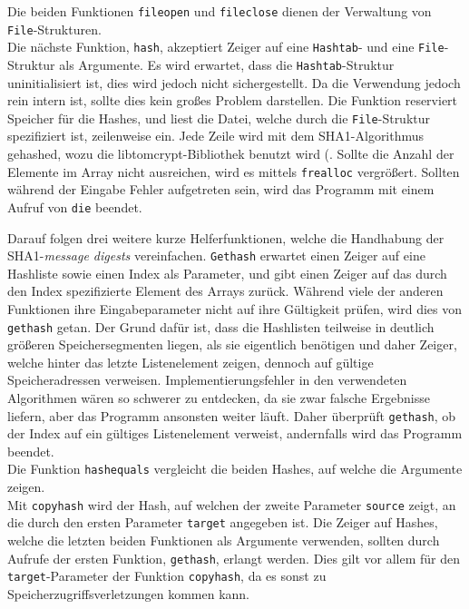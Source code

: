 \documentclass[a4paper,titlepage,12pt]{scrartcl}
\begin{document}
Die beiden Funktionen \texttt{fileopen} und \texttt{fileclose} dienen der Verwaltung von \texttt{File}-Strukturen.
\\
Die nächste Funktion, \texttt{hash}, akzeptiert Zeiger auf eine \texttt{Hashtab}- und eine \texttt{File}-Struktur als Argumente.
Es wird erwartet,
dass die \texttt{Hashtab}-Struktur uninitialisiert ist,
dies wird jedoch nicht sichergestellt.
Da die Verwendung jedoch rein intern ist,
sollte dies kein großes Problem darstellen.
Die Funktion reserviert Speicher für die Hashes,
und liest die Datei,
welche durch die \texttt{File}-Struktur spezifiziert ist,
zeilenweise ein.
Jede Zeile wird mit dem SHA1-Algorithmus gehashed,
wozu die libtomcrypt-Bibliothek benutzt wird (\citet{lib:tomcrypt}.
Sollte die Anzahl der Elemente im Array nicht ausreichen,
wird es mittels \texttt{frealloc} vergrößert.
Sollten während der Eingabe Fehler aufgetreten sein,
wird das Programm mit einem Aufruf von \texttt{die} beendet.

Darauf folgen drei weitere kurze Helferfunktionen,
welche die Handhabung der SHA1-\emph{message digests} vereinfachen.
\texttt{Gethash} erwartet einen Zeiger auf eine Hashliste sowie einen Index als Parameter,
und gibt einen Zeiger auf das durch den Index spezifizierte Element des Arrays zurück.
Während viele der anderen Funktionen ihre Eingabeparameter nicht auf ihre Gültigkeit prüfen,
wird dies von \texttt{gethash} getan.
Der Grund dafür ist,
dass die Hashlisten teilweise in deutlich größeren Speichersegmenten liegen,
als sie eigentlich benötigen und daher Zeiger,
welche hinter das letzte Listenelement zeigen,
dennoch auf gültige Speicheradressen verweisen.
Implementierungsfehler in den verwendeten Algorithmen wären so schwerer zu entdecken,
da sie zwar falsche Ergebnisse liefern,
aber das Programm ansonsten weiter läuft.
Daher überprüft \texttt{gethash},
ob der Index auf ein gültiges Listenelement verweist,
andernfalls wird das Programm beendet.
\\
Die Funktion \texttt{hashequals} vergleicht die beiden Hashes,
auf welche die Argumente zeigen.
\\
Mit \texttt{copyhash} wird der Hash,
auf welchen der zweite Parameter \texttt{source} zeigt,
an die durch den ersten Parameter \texttt{target} angegeben ist.
Die Zeiger auf Hashes,
welche die letzten beiden Funktionen als Argumente verwenden,
sollten durch Aufrufe der ersten Funktion, \texttt{gethash},
erlangt werden.
Dies gilt vor allem für den \texttt{target}-Parameter der Funktion \texttt{copyhash},
da es sonst zu Speicherzugriffsverletzungen kommen kann.
\end{document}
